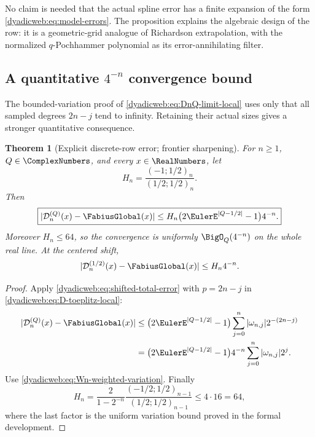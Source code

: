 \documentclass[11pt,oneside]{article}
\newtheorem{theorem}{Theorem}[section]
\theoremstyle{definition}
\theoremstyle{remark}
\begin{document}
No claim is needed that the actual spline error has a finite expansion of the form
\eqref{dyadicweb:eq:model-errors}.  The proposition explains the algebraic design of the row: it is a
geometric-grid analogue of Richardson extrapolation, with the normalized $q$-Pochhammer
polynomial as its error-annihilating filter.

\subsection[A quantitative four-to-the-minus-n convergence bound]{A quantitative $4^{-n}$ convergence bound}

The bounded-variation proof of \eqref{dyadicweb:eq:DnQ-limit-local} uses only that all sampled degrees
$2n-j$ tend to infinity.  Retaining their actual sizes gives a stronger quantitative
consequence.

\begin{theorem}[Explicit discrete-row error; frontier sharpening]
\label{dyadicweb:thm:D-error}
For $n\ge1$, $Q\in\ComplexNumbers$, and every $x\in\RealNumbers$, let
\begin{equation}
 H_n=\frac{(-1;1/2)_n}{(1/2;1/2)_n}.                      \label{dyadicweb:eq:Hn-def}
\end{equation}
Then
\begin{equation}
 \boxed{
 |\mathcal D_n^{(Q)}(x)-\FabiusGlobal(x)|
 \le H_n\bigl(2\EulerE^{|Q-1/2|}-1\bigr)4^{-n}.}              \label{dyadicweb:eq:D-error}
\end{equation}
Moreover $H_n\le64$, so the convergence is uniformly $\BigO_Q(4^{-n})$ on the whole real
line.  At the centered shift,
\begin{equation}
 |\mathcal D_n^{(1/2)}(x)-\FabiusGlobal(x)|\le H_n4^{-n}.     \label{dyadicweb:eq:D-centered-error}
\end{equation}
\end{theorem}

\begin{proof}
Apply \eqref{dyadicweb:eq:shifted-total-error} with $p=2n-j$ in
\eqref{dyadicweb:eq:D-toeplitz-local}:
\begin{align*}
 |\mathcal D_n^{(Q)}(x)-\FabiusGlobal(x)|
 &\le\bigl(2\EulerE^{|Q-1/2|}-1\bigr)
 \sum_{j=0}^{n}|\omega_{n,j}|2^{-(2n-j)}\\
 &=\bigl(2\EulerE^{|Q-1/2|}-1\bigr)4^{-n}
 \sum_{j=0}^{n}|\omega_{n,j}|2^j.
\end{align*}
Use \eqref{dyadicweb:eq:Wn-weighted-variation}.  Finally
\[
 H_n
 =\frac{2}{1-2^{-n}}
   \frac{(-1/2;1/2)_{n-1}}{(1/2;1/2)_{n-1}}
 \le4\cdot16=64,
\]
where the last factor is the uniform variation bound proved in the formal development.
\end{proof}
\end{document}
